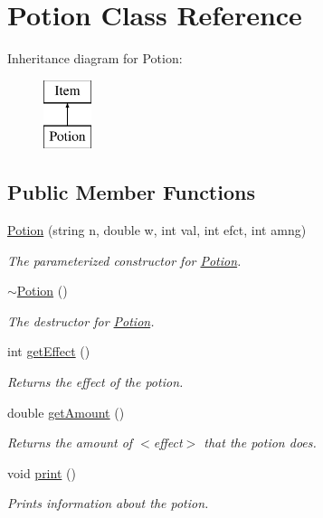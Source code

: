 \hypertarget{class_potion}{}\section{Potion Class Reference}
\label{class_potion}
Inheritance diagram for Potion\+:\begin{figure}[H]
\begin{center}
\leavevmode
\includegraphics[height=2.000000cm]{class_potion}
\end{center}
\end{figure}
\subsection*{Public Member Functions}
\begin{DoxyCompactItemize}
\item 
\mbox{\hyperlink{class_potion_a80ff683cfd7335b791290ec54eb938eb}{Potion}} (string n, double w, int val, int efct, int amng)
\begin{DoxyCompactList}\small\item\em The parameterized constructor for \mbox{\hyperlink{class_potion}{Potion}}. \end{DoxyCompactList}\item 
\mbox{\label{class_potion_a8730c8052ec698171885bb5dacda9cca}} 
\mbox{\hyperlink{class_potion_a8730c8052ec698171885bb5dacda9cca}{$\sim$\+Potion}} ()
\begin{DoxyCompactList}\small\item\em The destructor for \mbox{\hyperlink{class_potion}{Potion}}. \end{DoxyCompactList}\item 
int \mbox{\hyperlink{class_potion_abd59ead47388b4e6bf7ce3a11a6f4d27}{get\+Effect}} ()
\begin{DoxyCompactList}\small\item\em Returns the effect of the potion. \end{DoxyCompactList}\item 
double \mbox{\hyperlink{class_potion_ab279398e26ca96f58157ee9ae3534874}{get\+Amount}} ()
\begin{DoxyCompactList}\small\item\em Returns the amount of $<$effect$>$ that the potion does. \end{DoxyCompactList}\item 
\mbox{\label{class_potion_a6c55538d81e6705cb5be40c9021b0603}} 
void \mbox{\hyperlink{class_potion_a6c55538d81e6705cb5be40c9021b0603}{print}} ()
\begin{DoxyCompactList}\small\item\em Prints information about the potion. \end{DoxyCompactList}\end{DoxyCompactItemize}
